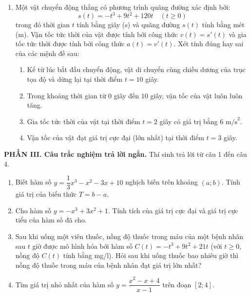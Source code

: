 \documentclass[12pt]{article}
\begin{document}
\begin{enumerate}[label=\textbf{Câu \arabic*.}, leftmargin=*]
		\vspace{4mm}
		\item Một vật chuyển động thẳng có phương trình quãng đường xác định bởi:
		\[ s(t) = -t^3 + 9t^2 + 120t \quad (t \ge 0) \]
		trong đó thời gian $t$ tính bằng giây (s) và quãng đường $s(t)$ tính bằng mét (m). Vận tốc tức thời của vật được tính bởi công thức $v(t) = s'(t)$ và gia tốc tức thời được tính bởi công thức $a(t) = v'(t)$. Xét tính đúng hay sai của các mệnh đề sau:
		\begin{enumerate}[label=\alph*)]
			\item Kể từ lúc bắt đầu chuyển động, vật di chuyển cùng chiều dương của trục tọa độ và dừng lại tại thời điểm $t = 10$ giây.
			\item Trong khoảng thời gian từ $0$ giây đến $10$ giây, vận tốc của vật luôn luôn tăng.
			\item Gia tốc tức thời của vật tại thời điểm $t = 2$ giây có giá trị bằng $6 \text{ m/s}^2$.
			\item Vận tốc của vật đạt giá trị cực đại (lớn nhất) tại thời điểm $t = 3$ giây.
		\end{enumerate}
		
	\end{enumerate}
	
	\vspace{4mm}
	\noindent\textbf{PHẦN III. Câu trắc nghiệm trả lời ngắn.} Thí sinh trả lời từ câu 1 đến câu 4.
	\vspace{2mm}
	
	\begin{enumerate}[label=\textbf{Câu \arabic*.}, leftmargin=*]
		
		\item Biết hàm số $y = \dfrac{1}{3}x^3 - x^2 - 3x + 10$ nghịch biến trên khoảng $(a; b)$. Tính giá trị của biểu thức $T = b - a$.
		
		\item Cho hàm số $y = -x^3 + 3x^2 + 1$. Tính tích của giá trị cực đại và giá trị cực tiểu của hàm số đã cho.
		
		\item Sau khi uống một viên thuốc, nồng độ thuốc trong máu của một bệnh nhân sau $t$ giờ được mô hình hóa bởi hàm số $C(t) = -t^3 + 9t^2 + 21t$ (với $t \ge 0$, nồng độ $C(t)$ tính bằng mg/l). Hỏi sau khi uống thuốc bao nhiêu giờ thì nồng độ thuốc trong máu của bệnh nhân đạt giá trị lớn nhất?
		
		\item Tìm giá trị nhỏ nhất của hàm số $y = \dfrac{x^2 - x + 4}{x - 1}$ trên đoạn $[2; 4]$.
		
	\end{enumerate}
	
\end{document}

